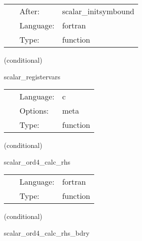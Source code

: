 \begin{tabular*}{160mm}{cll} 
~ & After:  & scalar\_initsymbound \\ 
~ & Language:  & fortran \\ 
~ & Type:  & function \\ 
\end{tabular*} 


\vspace{5mm}

   (conditional) 

\hspace{5mm} scalar\_registervars 

\hspace{5mm}{\it register variables for mol } 


\hspace{5mm}

 \begin{tabular*}{160mm}{cll} 
~ & Language:  & c \\ 
~ & Options:  & meta \\ 
~ & Type:  & function \\ 
\end{tabular*} 


\vspace{5mm}

   (conditional) 

\hspace{5mm} scalar\_ord4\_calc\_rhs 

\hspace{5mm}{\it mol rhs calculation for scalar variables } 


\hspace{5mm}

 \begin{tabular*}{160mm}{cll} 
~ & Language:  & fortran \\ 
~ & Type:  & function \\ 
\end{tabular*} 


\vspace{5mm}

   (conditional) 

\hspace{5mm} scalar\_ord4\_calc\_rhs\_bdry 

\hspace{5mm}{\it mol boundary rhs calculation for scalar variables } 


\hspace{5mm}

